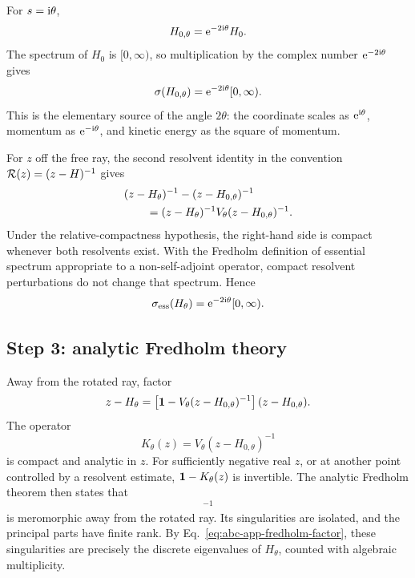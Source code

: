 For $s=\mathrm{i}\theta$,
\begin{equation}
  H_{0,\theta}=\mathrm{e}^{-2\mathrm{i}\theta}H_0 .
  \label{eq:abc-app-free-Htheta}
\end{equation}
The spectrum of $H_0$ is $[0,\infty)$, so multiplication by the complex
number $\mathrm{e}^{-2\mathrm{i}\theta}$ gives
\begin{equation}
  \sigma(H_{0,\theta})
  =\mathrm{e}^{-2\mathrm{i}\theta}[0,\infty) .
  \label{eq:abc-app-free-spectrum}
\end{equation}
This is the elementary source of the angle $2\theta$: the coordinate scales
as $\mathrm{e}^{\mathrm{i}\theta}$, momentum as $\mathrm{e}^{-\mathrm{i}\theta}$, and kinetic energy
as the square of momentum.

For $z$ off the free ray, the second resolvent identity in the convention
$\mathcal{R}(z)=(z-H)^{-1}$ gives
\begin{align}
  &(z-H_\theta)^{-1}-(z-H_{0,\theta})^{-1}
  \notag\\
  &\qquad=(z-H_\theta)^{-1}V_\theta
  (z-H_{0,\theta})^{-1} .
  \label{eq:abc-app-resolvent-difference}
\end{align}
Under the relative-compactness hypothesis, the right-hand side is compact
whenever both resolvents exist.  With the Fredholm definition of essential
spectrum appropriate to a non-self-adjoint operator, compact resolvent
perturbations do not change that spectrum.  Hence
\begin{equation}
  \sigma_{\mathrm{ess}}(H_\theta)
  =\mathrm{e}^{-2\mathrm{i}\theta}[0,\infty) .
  \label{eq:abc-app-essential-spectrum}
\end{equation}

\subsection*{Step 3: analytic Fredholm theory}

Away from the rotated ray, factor
\begin{equation}
  z-H_\theta
  =\left[\mathbf{1}-V_\theta(z-H_{0,\theta})^{-1}\right]
  (z-H_{0,\theta}) .
  \label{eq:abc-app-fredholm-factor}
\end{equation}
The operator
\begin{equation}
  K_\theta(z)=V_\theta(z-H_{0,\theta})^{-1}
  \label{eq:abc-app-K}
\end{equation}
is compact and analytic in $z$.  For sufficiently negative real $z$, or at
another point controlled by a resolvent estimate,
$\mathbf{1}-K_\theta(z)$ is invertible.  The analytic Fredholm theorem then
states that
\begin{equation}
  [\identity-K_\theta(z)]^{-1}
  \label{eq:abc-app-fredholm-inverse}
\end{equation}
is meromorphic away from the rotated ray.  Its singularities are isolated,
and the principal parts have finite rank.  By
Eq.~\eqref{eq:abc-app-fredholm-factor}, these singularities are precisely the
discrete eigenvalues of $H_\theta$, counted with algebraic multiplicity.

